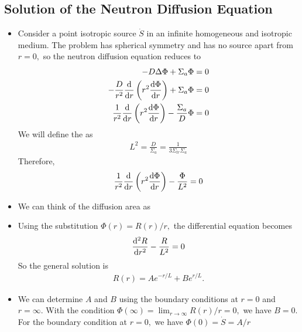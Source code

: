 \documentclass[a4paper]{article}
\begin{document}
\subsection{Solution of the Neutron Diffusion Equation}
\begin{itemize}
    \item Consider a point isotropic source $\dot S$ in an infinite homogeneous and isotropic medium. The problem has spherical symmetry and has no source apart from $r=0,$ so the neutron diffusion equation reduces to \begin{align}
        -D\Delta\Phi+\Sigma_a\Phi=0\\
        -\frac{D}{r^2}\derivative{}{r}\left(r^2\derivative{\Phi}{r}\right)+\Sigma_a\Phi=0\\
        \frac{1}{r^2}\derivative{}{r}\left(r^2\derivative{\Phi}{r}\right)-\frac{\Sigma_a}{D}\Phi=0
    \end{align}
    We will define the  as \begin{align}
        L^2=\frac{D}{\Sigma_a}=\frac{1}{3\Sigma_{tr}\Sigma_a}
    \end{align}
    Therefore,
    \begin{align}
        \frac{1}{r^2}\derivative{}{r}\left(r^2\derivative{\Phi}{r}\right)-\frac{\Phi}{L^2}=0
    \end{align}
    \item We can think of the diffusion area as 
    \item Using the substitution $\Phi(r)=R(r)/r,$ the differential equation becomes \begin{align}
        \derivative{^2R}{r^2}-\frac{R}{L^2}=0
    \end{align}
    So the general solution is \begin{align}
        R(r)=Ae^{-r/L}+Be^{r/L}.
    \end{align}
    \item We can determine $A$ and $B$ using the boundary conditions at $r=0$ and $r=\infty.$ With the condition $\Phi(\infty)=\lim_{r\to\infty}R(r)/r=0,$ we have $B=0.$ For the boundary condition at $r=0,$ we have $\Phi(0)=\dot S=A/r$
\end{itemize}
\end{document}
